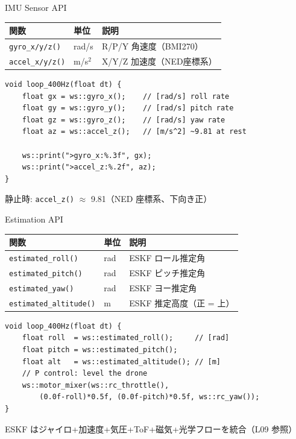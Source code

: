 \begin{frame}[fragile]{IMU Sensor API}
  {\small
  \begin{tabular}{lll}
    \hline
    \textbf{関数} & \textbf{単位} & \textbf{説明} \\
    \hline
    \texttt{gyro\_x/y/z()}  & rad/s   & R/P/Y 角速度（BMI270） \\
    \texttt{accel\_x/y/z()} & m/s$^2$ & X/Y/Z 加速度（NED座標系） \\
    \hline
  \end{tabular}
  }

  \vspace{0.3em}

  \begin{lstlisting}[style=sfcpp, basicstyle=\ttfamily\scriptsize]
void loop_400Hz(float dt) {
    float gx = ws::gyro_x();    // [rad/s] roll rate
    float gy = ws::gyro_y();    // [rad/s] pitch rate
    float gz = ws::gyro_z();    // [rad/s] yaw rate
    float az = ws::accel_z();   // [m/s^2] ~9.81 at rest

    ws::print(">gyro_x:%.3f", gx);
    ws::print(">accel_z:%.2f", az);
}
  \end{lstlisting}

  \vspace{0.2em}
  {\footnotesize 静止時: \texttt{accel\_z()} $\approx$ 9.81（NED 座標系、下向き正）}
\end{frame}

\begin{frame}[fragile]{Estimation API}
  {\small
  \begin{tabular}{lll}
    \hline
    \textbf{関数} & \textbf{単位} & \textbf{説明} \\
    \hline
    \texttt{estimated\_roll()}     & rad & ESKF ロール推定角 \\
    \texttt{estimated\_pitch()}    & rad & ESKF ピッチ推定角 \\
    \texttt{estimated\_yaw()}      & rad & ESKF ヨー推定角 \\
    \texttt{estimated\_altitude()} & m   & ESKF 推定高度（正 = 上） \\
    \hline
  \end{tabular}
  }

  \vspace{0.3em}

  \begin{lstlisting}[style=sfcpp, basicstyle=\ttfamily\scriptsize]
void loop_400Hz(float dt) {
    float roll  = ws::estimated_roll();     // [rad]
    float pitch = ws::estimated_pitch();
    float alt   = ws::estimated_altitude(); // [m]
    // P control: level the drone
    ws::motor_mixer(ws::rc_throttle(),
        (0.0f-roll)*0.5f, (0.0f-pitch)*0.5f, ws::rc_yaw());
}
  \end{lstlisting}

  \vspace{0.2em}
  {\footnotesize ESKF はジャイロ+加速度+気圧+ToF+磁気+光学フローを統合（L09 参照）}
\end{frame}

